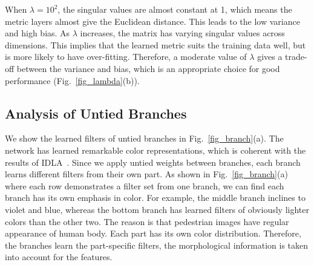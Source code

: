 \documentclass[runningheads]{llncs}
\begin{document}
When $\lambda = 10^2$, the singular values are almost constant at 1, which means the metric layers almost give the Euclidean distance. This leads to the low variance and high bias.
As $\lambda$ increases, the matrix has varying singular values across dimensions.
This implies that the learned metric suits the training data well, but is more likely to have over-fitting.
Therefore, a moderate value of $\lambda$ gives a trade-off between the variance and bias, which is an appropriate choice for good performance (Fig.~\ref{fig_lambda}(b)).

\begin{figure*}[!h]
  \centering
  \hspace{2pt}


  \caption{(a) The spectrums of the matrix $\textbf{M}$. The spectrums with $\lambda=10^1, 10^0$ are very close; those with $\lambda=10^{-3}, 10^{-4}, 0$ are also very close. Best viewed in color.
  (b) The rank-1 identification rates with different $\lambda$ of the weight constraint. }
  \label{fig_lambda}
\end{figure*}






\subsection{Analysis of Untied Branches}
\label{section_Analysis of Untied Branches}

We show the learned filters of untied branches in Fig.~\ref{fig_branch}(a).
The network has learned remarkable color representations, which is coherent with the results of IDLA~\cite{ahmed2015improved}.
Since we apply untied weights between branches, each branch learns different filters from their own part.
As shown in Fig.~\ref{fig_branch}(a) where each row demonstrates a filter set from one branch,
we can find each branch has its own emphasis in color.
For example, the middle branch inclines to violet and blue, whereas the bottom branch has learned filters of obviously lighter colors than the other two.
The reason is that pedestrian images have regular appearance of human body.
Each part has its own color distribution.
Therefore, the branches learn the part-specific filters, the morphological information is taken into account for the features.
\end{document}
